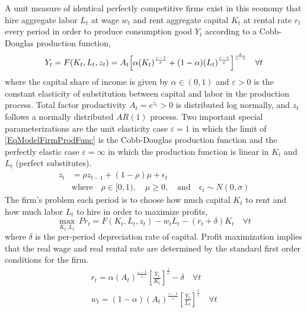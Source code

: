 \documentclass[letterpaper,12pt]{article}
\theoremstyle{definition}
\newcommand\ve{\varepsilon}
\begin{document}
\begin{spacing}{1.5}
    A unit measure of identical perfectly competitive firms exist in this economy that hire aggregate labor $L_t$ at wage $w_t$ and rent aggregate capital $K_t$ at rental rate $r_t$ every period in order to produce consumption good $Y_t$ according to a Cobb-Douglas production function,
    \begin{equation}\label{EqModelFirmProdFunc}
       Y_t = F(K_t, L_t, z_t) = A_t\Bigl[\alpha(K_t)^\frac{\ve-1}{\ve} + (1 - \alpha)(L_t)^\frac{\ve-1}{\ve}\Bigr]^\frac{\ve}{\ve-1} \quad\forall t
    \end{equation}
    where the capital share of income is given by $\alpha\in(0,1)$ and $\ve>0$ is the constant elasticity of substitution between capital and labor in the production process. Total factor productivity $A_t = e^{z_t}>0$ is distributed log normally, and $z_t$ follows a normally distributed $AR(1)$ process. Two important special parameterizations are the unit elasticity case $\ve=1$ in which the limit of \eqref{EqModelFirmProdFunc} is the Cobb-Douglas production function and the perfectly elastic case $\ve=\infty$ in which the production function is linear in $K_t$ and $L_t$ (perfect substitutes).
    \begin{equation}\label{EqModelFirmZAR1}
      \begin{split}
        z_t &= \rho z_{t-1} + (1-\rho)\mu + \epsilon_t \\
        &\text{where}\quad \rho\in[0,1),\quad\mu\geq 0, \quad\text{and}\quad \epsilon_t \sim N(0,\sigma)
      \end{split}
    \end{equation}
    The firm's problem each period is to choose how much capital $K_t$ to rent and how much labor $L_t$ to hire in order to maximize profits,
    \begin{equation}\label{EqModelFirmProfMax}
      \max_{K_t, L_t}\:Pr_t = F(K_t, L_t, z_t) - w_t L_t - (r_t + \delta)K_t \quad\forall t
    \end{equation}
    where $\delta$ is the per-period depreciation rate of capital. Profit maximization implies that the real wage and real rental rate are determined by the standard first order conditions for the firm.
    \begin{gather}
      r_t = \alpha(A_t)^\frac{\ve-1}{\ve}\left[\frac{Y_t}{K_t}\right]^\frac{1}{\ve} - \delta \quad\forall t \label{EqModelFirm_FOCK} \\
      w_t = (1 - \alpha)(A_t)^\frac{\ve-1}{\ve}\left[\frac{Y_t}{L_t}\right]^\frac{1}{\ve} \quad\forall t \label{EqModelFirm_FOCL}
    \end{gather}


\end{spacing}
\end{document}
